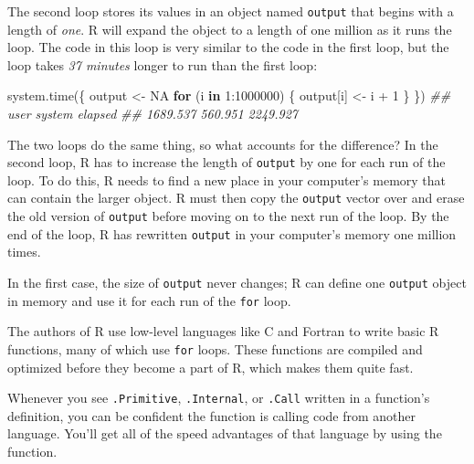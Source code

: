 \documentclass[
  letterpaper,
  DIV=11,
  numbers=noendperiod]{scrbook}
\newenvironment{Shaded}{\begin{snugshade}}{\end{snugshade}}
\newcommand{\ConstantTok}[1]{\textcolor[rgb]{0.56,0.35,0.01}{#1}}
\newcommand{\ControlFlowTok}[1]{\textcolor[rgb]{0.00,0.23,0.31}{\textbf{#1}}}
\newcommand{\DecValTok}[1]{\textcolor[rgb]{0.68,0.00,0.00}{#1}}
\newcommand{\DocumentationTok}[1]{\textcolor[rgb]{0.37,0.37,0.37}{\textit{#1}}}
\newcommand{\FunctionTok}[1]{\textcolor[rgb]{0.28,0.35,0.67}{#1}}
\newcommand{\NormalTok}[1]{\textcolor[rgb]{0.00,0.23,0.31}{#1}}
\newcommand{\OtherTok}[1]{\textcolor[rgb]{0.00,0.23,0.31}{#1}}
\newcommand{\SpecialCharTok}[1]{\textcolor[rgb]{0.37,0.37,0.37}{#1}}
\begin{document}
The second loop stores its values in an object named \texttt{output}
that begins with a length of \emph{one}. R will expand the object to a
length of one million as it runs the loop. The code in this loop is very
similar to the code in the first loop, but the loop takes \emph{37
minutes} longer to run than the first loop:

\begin{Shaded}
\begin{Highlighting}[]
\FunctionTok{system.time}\NormalTok{(\{}
\NormalTok{  output }\OtherTok{\textless{}{-}} \ConstantTok{NA} 
  \ControlFlowTok{for}\NormalTok{ (i }\ControlFlowTok{in} \DecValTok{1}\SpecialCharTok{:}\DecValTok{1000000}\NormalTok{) \{}
\NormalTok{    output[i] }\OtherTok{\textless{}{-}}\NormalTok{ i }\SpecialCharTok{+} \DecValTok{1}
\NormalTok{  \}}
\NormalTok{\})}
\DocumentationTok{\#\#     user   system  elapsed }
\DocumentationTok{\#\# 1689.537  560.951 2249.927}
\end{Highlighting}
\end{Shaded}

The two loops do the same thing, so what accounts for the difference? In
the second loop, R has to increase the length of \texttt{output} by one
for each run of the loop. To do this, R needs to find a new place in
your computer's memory that can contain the larger object. R must then
copy the \texttt{output} vector over and erase the old version of
\texttt{output} before moving on to the next run of the loop. By the end
of the loop, R has rewritten \texttt{output} in your computer's memory
one million times.

In the first case, the size of \texttt{output} never changes; R can
define one \texttt{output} object in memory and use it for each run of
the \texttt{for} loop.

\begin{tcolorbox}[enhanced jigsaw, breakable, colback=white, colbacktitle=quarto-callout-tip-color!10!white, arc=.35mm, bottomrule=.15mm, coltitle=black, left=2mm, rightrule=.15mm, colframe=quarto-callout-tip-color-frame, leftrule=.75mm, opacitybacktitle=0.6, bottomtitle=1mm, toptitle=1mm, titlerule=0mm, opacityback=0, title=\textcolor{quarto-callout-tip-color}{\faLightbulb}\hspace{0.5em}{Tip}, toprule=.15mm]

The authors of R use low-level languages like C and Fortran to write
basic R functions, many of which use \texttt{for} loops. These functions
are compiled and optimized before they become a part of R, which makes
them quite fast.

Whenever you see \texttt{.Primitive}, \texttt{.Internal}, or
\texttt{.Call} written in a function's definition, you can be confident
the function is calling code from another language. You'll get all of
the speed advantages of that language by using the function.

\end{tcolorbox}
\end{document}
